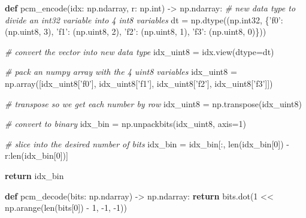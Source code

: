 \documentclass[11pt]{article}
\newenvironment{Shaded}{}{}
\newcommand{\KeywordTok}[1]{\textcolor[rgb]{0.00,0.44,0.13}{\textbf{{#1}}}}
\newcommand{\DecValTok}[1]{\textcolor[rgb]{0.25,0.63,0.44}{{#1}}}
\newcommand{\StringTok}[1]{\textcolor[rgb]{0.25,0.44,0.63}{{#1}}}
\newcommand{\CommentTok}[1]{\textcolor[rgb]{0.38,0.63,0.69}{\textit{{#1}}}}
\newcommand{\NormalTok}[1]{{#1}}
\newcommand{\ControlFlowTok}[1]{\textcolor[rgb]{0.00,0.44,0.13}{\textbf{{#1}}}}
\newcommand{\OperatorTok}[1]{\textcolor[rgb]{0.40,0.40,0.40}{{#1}}}
\newcommand{\BuiltInTok}[1]{{#1}}
\begin{document}
\begin{Shaded}
\begin{Highlighting}[]
\KeywordTok{def} \NormalTok{pcm_encode(idx: np.ndarray, r: np.}\BuiltInTok{int}\NormalTok{) }\OperatorTok{->} \NormalTok{np.ndarray:}
    \CommentTok{# new data type to divide an int32 variable into 4 int8 variables}
    \NormalTok{dt }\OperatorTok{=} \NormalTok{np.dtype((np.int32, \{}\StringTok{'f0'}\NormalTok{: (np.uint8, }\DecValTok{3}\NormalTok{), }\StringTok{'f1'}\NormalTok{: (np.uint8, }\DecValTok{2}\NormalTok{), }\StringTok{'f2'}\NormalTok{: (np.uint8, }\DecValTok{1}\NormalTok{), }\StringTok{'f3'}\NormalTok{: (np.uint8, }\DecValTok{0}\NormalTok{)\}))}

    \CommentTok{# convert the vector into new data type}
    \NormalTok{idx_uint8 }\OperatorTok{=} \NormalTok{idx.view(dtype}\OperatorTok{=}\NormalTok{dt)}

    \CommentTok{# pack an numpy array with the 4 uint8 variables}
    \NormalTok{idx_uint8 }\OperatorTok{=} \NormalTok{np.array([idx_uint8[}\StringTok{'f0'}\NormalTok{], idx_uint8[}\StringTok{'f1'}\NormalTok{], idx_uint8[}\StringTok{'f2'}\NormalTok{], idx_uint8[}\StringTok{'f3'}\NormalTok{]])}

    \CommentTok{# transpose so we get each number by row}
    \NormalTok{idx_uint8 }\OperatorTok{=} \NormalTok{np.transpose(idx_uint8)}

    \CommentTok{# convert to binary}
    \NormalTok{idx_bin }\OperatorTok{=} \NormalTok{np.unpackbits(idx_uint8, axis}\OperatorTok{=}\DecValTok{1}\NormalTok{)}

    \CommentTok{# slice into the desired number of bits}
    \NormalTok{idx_bin }\OperatorTok{=} \NormalTok{idx_bin[:, }\BuiltInTok{len}\NormalTok{(idx_bin[}\DecValTok{0}\NormalTok{]) }\OperatorTok{-} \NormalTok{r:}\BuiltInTok{len}\NormalTok{(idx_bin[}\DecValTok{0}\NormalTok{])]}

    \ControlFlowTok{return} \NormalTok{idx_bin}
\end{Highlighting}
\end{Shaded}

\begin{Shaded}
\begin{Highlighting}[]
\KeywordTok{def} \NormalTok{pcm_decode(bits: np.ndarray) }\OperatorTok{->} \NormalTok{np.ndarray:}
    \ControlFlowTok{return} \NormalTok{bits.dot(}\DecValTok{1} \OperatorTok{<<} \NormalTok{np.arange(}\BuiltInTok{len}\NormalTok{(bits[}\DecValTok{0}\NormalTok{]) }\OperatorTok{-} \DecValTok{1}\NormalTok{, }\OperatorTok{-}\DecValTok{1}\NormalTok{, }\OperatorTok{-}\DecValTok{1}\NormalTok{))}
\end{Highlighting}
\end{Shaded}
\end{document}
